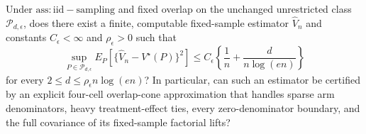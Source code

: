 Under \(\mathrm{ass:iid-sampling}\) and fixed overlap on the unchanged unrestricted class \(\mathcal P_{d,\epsilon}\), does there exist a finite, computable fixed-sample estimator \(\widehat V_n\) and constants \(C_\epsilon<\infty\) and \(\rho_\epsilon>0\) such that
\[
 \sup_{P\in\mathcal P_{d,\epsilon}}
 E_P\!\left[\{\widehat V_n-V^\star(P)\}^2\right]
 \le C_\epsilon\left\{\frac1n+\frac d{n\log(en)}\right\}
\]
for every \(2\le d\le\rho_\epsilon n\log(en)\)?  In particular, can such an estimator be certified by an explicit four-cell overlap-cone approximation that handles sparse arm denominators, heavy treatment-effect ties, every zero-denominator boundary, and the full covariance of its fixed-sample factorial lifts?